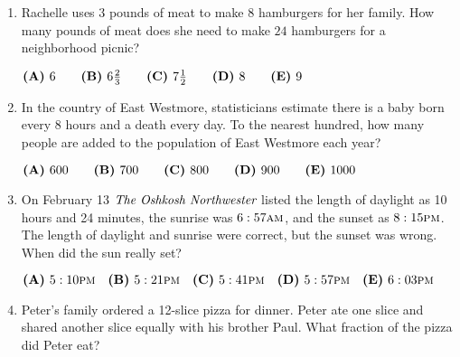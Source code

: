 \documentclass{article}
\begin{document}
\begin{enumerate}[label=\arabic*., itemsep=0.5em]
\item Rachelle uses \( 3 \) pounds of meat to make \( 8 \) hamburgers for her family. How many pounds of meat does she need to make \( 24 \) hamburgers for a neighborhood picnic?

\( \textbf{(A)}\hspace{.05in}6\qquad\textbf{(B)}\hspace{.05in}6\frac{2}3\qquad\textbf{(C)}\hspace{.05in}7\frac{1}2\qquad\textbf{(D)}\hspace{.05in}8\qquad\textbf{(E)}\hspace{.05in}9 \)\par \vspace{0.5em}\item In the country of East Westmore, statisticians estimate there is a baby born every \( 8 \) hours and a death every day. To the nearest hundred, how many people are added to the population of East Westmore each year?

\( \textbf{(A)}\hspace{.05in}600\qquad\textbf{(B)}\hspace{.05in}700\qquad\textbf{(C)}\hspace{.05in}800\qquad\textbf{(D)}\hspace{.05in}900\qquad\textbf{(E)}\hspace{.05in}1000 \)\par \vspace{0.5em}\item On February 13 \(\emph{The Oshkosh Northwester}\) listed the length of daylight as 10 hours and 24 minutes, the sunrise was \( 6:57\textsc{am} \), and the sunset as \( 8:15\textsc{pm} \). The length of daylight and sunrise were correct, but the sunset was wrong. When did the sun really set?

\( \textbf{(A)}\hspace{.05in}5:10\textsc{pm}\quad\textbf{(B)}\hspace{.05in}5:21\textsc{pm}\quad\textbf{(C)}\hspace{.05in}5:41\textsc{pm}\quad\textbf{(D)}\hspace{.05in}5:57\textsc{pm}\quad\textbf{(E)}\hspace{.05in}6:03\textsc{pm} \)\par \vspace{0.5em}\item Peter's family ordered a 12-slice pizza for dinner. Peter ate one slice and shared another slice equally with his brother Paul. What fraction of the pizza did Peter eat?


\end{enumerate}
\end{document}
